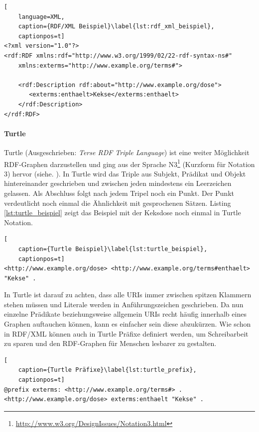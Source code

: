 \begin{lstlisting}[
    language=XML,
    caption={RDF/XML Beispiel}\label{lst:rdf_xml_beispiel},
    captionpos=t]
<?xml version="1.0"?>
<rdf:RDF xmlns:rdf="http://www.w3.org/1999/02/22-rdf-syntax-ns#"
    xmlns:exterms="http://www.example.org/terms#">

    <rdf:Description rdf:about="http://www.example.org/dose">
       <exterms:enthaelt>Kekse</exterms:enthaelt>
    </rdf:Description>
</rdf:RDF>
\end{lstlisting}

\paragraph{Turtle} %
\label{par:turtle}

Turtle (Ausgeschrieben: \emph{Terse RDF Triple Language}) ist eine weiter Möglichkeit RDF-Graphen darzustellen und ging aus der Sprache N3\footnote{\url{http://www.w3.org/DesignIssues/Notation3.html}} (Kurzform für Notation 3) hervor (siehe. \cite{DavidBeckett}). In Turtle wird das Triple aus Subjekt, Prädikat und Objekt hintereinander geschrieben und zwischen jeden mindestens ein Leerzeichen gelassen. Als Abschluss folgt nach jedem Tripel noch ein Punkt. Der Punkt verdeutlicht noch einmal die Ähnlichkeit mit gesprochenen Sätzen. Listing \ref{lst:turtle_beispiel} zeigt das Beispiel mit der Keksdose noch einmal in Turtle Notation. 

\begin{lstlisting}[
    caption={Turtle Beispiel}\label{lst:turtle_beispiel},
    captionpos=t]
<http://www.example.org/dose> <http://www.example.org/terms#enthaelt> "Kekse" .
\end{lstlisting} 


In Turtle ist darauf zu achten, dass alle URIs immer zwischen spitzen Klammern stehen müssen und Literale werden in Anführungszeichen geschrieben. Da nun einzelne Prädikate beziehungsweise allgemein URIs recht häufig innerhalb eines Graphen auftauchen können, kann es einfacher sein diese abzukürzen. Wie schon in RDF/XML können auch in Turtle Präfixe definiert werden, um Schreibarbeit zu sparen und den RDF-Graphen für Menschen lesbarer zu gestalten.

\begin{lstlisting}[
    caption={Turtle Präfixe}\label{lst:turtle_prefix},
    captionpos=t]
@prefix exterms: <http://www.example.org/terms#> .
<http://www.example.org/dose> exterms:enthaelt "Kekse" .   
\end{lstlisting}

